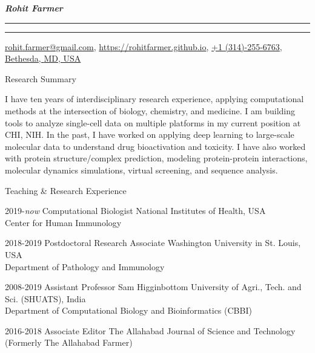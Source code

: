 \documentclass[10pt]{article}
\begin{document}
\settowidth{\cvlabelwidth}{%
\cvlabelfont 2009-2009%
}%
\begin{cv}{\huge \it \bfseries Rohit Farmer}
\vskip3pt
\hrule\hrule
\vskip3pt
\hfill \url{rohit.farmer@gmail.com},  \url{https://rohitfarmer.github.io}, \url{+1 (314)-255-6763}, \url{Bethesda, } \url{MD, USA}

{
\setlength{\cvlabelsep}{0mm}
\setlength{\cvlabelwidth}{0mm}
\begin{cvlist}{Research Summary}
	\item I have ten years of interdisciplinary research experience, applying computational methods at the intersection of biology, chemistry, and medicine. I am building tools to analyze single-cell data on multiple platforms in my current position at CHI, NIH. In the past, I have worked on applying deep learning to large-scale molecular data to understand drug bioactivation and toxicity. I have also worked with protein structure/complex prediction, modeling protein-protein interactions, molecular dynamics simulations, virtual screening, and sequence analysis.\end{cvlist}
}

\begin{cvlist}{Teaching \& Research Experience}
	\item[2019-\emph{now}] Computational Biologist \hfill National Institutes of Health, USA\\ \hspace*{\fill} Center for Human Immunology
	\item[2018-2019] Postdoctoral Research Associate \hfill Washington University in St. Louis, USA\\  \hspace*{\fill} Department of Pathology and Immunology
	\item[2008-2019] Assistant Professor \hfill Sam Higginbottom University of Agri., Tech. and Sci. (SHUATS), India\\  \hspace*{\fill} Department of Computational Biology and Bioinformatics (CBBI)
	\item[2016-2018] Associate Editor \hfill The Allahabad Journal of Science and Technology \\  \hspace*{\fill} (Formerly The Allahabad Farmer)
\end{cvlist}


\end{cv}
\end{document}
